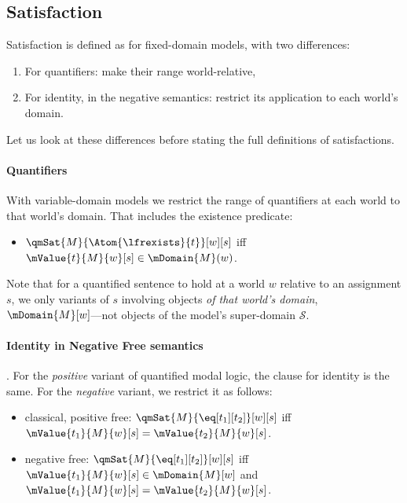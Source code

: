 \documentclass[../../../include/open-logic-section]{subfiles}
\begin{document}
\subsection{Satisfaction}

\begin{explain}

Satisfaction is defined as for fixed-domain models, with two differences:
\begin{enumerate}
\item For quantifiers: make their range world-relative,
\item For identity, in the negative semantics: restrict its application
to each world's domain.
\end{enumerate}
Let us look at these differences before stating the full 
definitions of satisfactions. 

\paragraph{Quantifiers} With variable-domain models we restrict the range of 
quantifiers at each world to that world's domain. That includes
the existence predicate:
\begin{itemize}
\item $\qmSat{M}{\Atom{\lfrexists}{t}}[w][s]$ iff 
  $\mValue{t}{M}{w}[s]\in \mDomain{M}(w)$.


\end{itemize}
Note that for a quantified sentence to hold at a world 
$w$ relative to an assignment $s$, we only variants
of $s$ involving objects \emph{of that world's domain}, 
$\mDomain{M}[w]$---not objects of the model's super-domain
 $\mathcal{S}$.

\paragraph{Identity in Negative Free semantics}. For the \emph{positive}
variant of quantified modal logic, the clause for identity
is the same. For the \emph{negative} variant, we restrict it 
as follows:

\begin{itemize}

\item classical, positive free: $\qmSat{M}{\eq[t_1][t_2]}[w][s]$ iff
  $\mValue{t_1}{M}{w}[s] = \mValue{t_2}{M}{w}[s]$.

\item negative free: $\qmSat{M}{\eq[t_1][t_2]}[w][s]$ iff
  $\mValue{t_1}{M}{w}[s]\in \mDomain{M}[w]$ and 
  $\mValue{t_1}{M}{w}[s] = \mValue{t_2}{M}{w}[s]$.

\end{itemize}

\end{explain}
\end{document}
